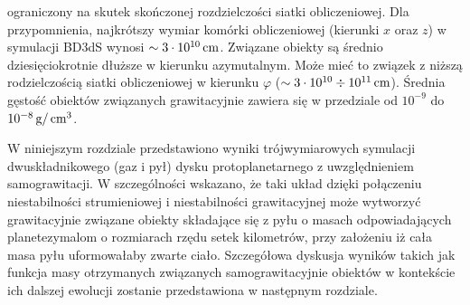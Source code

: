 ograniczony na skutek skończonej rozdzielczości siatki obliczeniowej. Dla
przypomnienia, najkrótszy wymiar komórki obliczeniowej (kierunki $x$ oraz $z$) w
symulacji BD3dS wynosi $\sim 3\cdot10^{10}\hbox{$\thinspace\textrm{cm}$}$. Związane obiekty są średnio
dziesięciokrotnie dłuższe w kierunku azymutalnym. Może mieć to związek z niższą
rodzielczością siatki obliczeniowej w kierunku $\varphi$ ($\sim 3\cdot10^{10}
\div 10^{11}\hbox{$\thinspace\textrm{cm}$}$). Średnia gęstość
obiektów związanych grawitacyjnie zawiera się w przedziale od $10^{-9}$ do
$10^{-8}\hbox{$\thinspace\textrm{g}$}/\hbox{$\thinspace\textrm{cm}$}^{3}$.
\par W niniejszym rozdziale przedstawiono wyniki trójwymiarowych symulacji
dwuskładnikowego (gaz i pył) dysku protoplanetarnego z uwzględnieniem
samograwitacji. W szczególności wskazano, że taki układ dzięki połączeniu
niestabilności strumieniowej i niestabilności grawitacyjnej może wytworzyć
grawitacyjnie związane obiekty składające się z pyłu o masach odpowiadających
planetezymalom o rozmiarach rzędu setek kilometrów, przy założeniu iż cała masa
pyłu uformowałaby zwarte ciało. Szczegółowa dyskusja wyników takich jak funkcja
masy otrzymanych związanych samograwitacyjnie obiektów w kontekście ich dalszej
ewolucji zostanie przedstawiona w następnym rozdziale.
%

